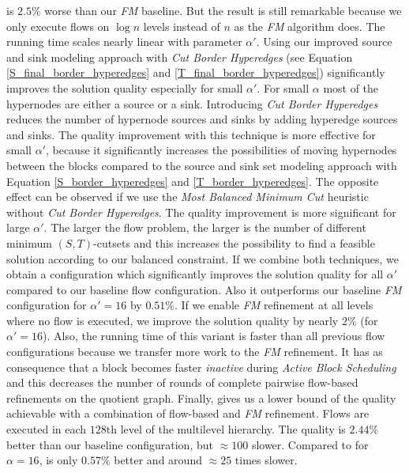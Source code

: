 is $2.5\%$ worse than our \emph{FM} baseline. But the result 
is still remarkable because we only execute flows on $\log{n}$ levels
instead of $n$ as the \emph{FM} algorithm does. The running time
scales nearly linear with parameter $\alpha'$. Using our improved source 
and sink modeling approach with \emph{Cut Border Hyperedges} (see Equation
\ref{S_final_border_hyperedges} and \ref{T_final_border_hyperedges})
significantly improves the solution quality especially for small $\alpha'$.
For small $\alpha$ most of the hypernodes are either a source or a sink. 
Introducing \emph{Cut Border Hyperedges} reduces the number of hypernode
sources and sinks by adding hyperedge sources and sinks. The quality 
improvement with this technique is more effective
for small $\alpha'$, because it significantly increases the possibilities
of moving hypernodes between the blocks compared to the source and sink set
modeling approach with Equation \ref{S_border_hyperedges} and \ref{T_border_hyperedges}.
The opposite effect can be observed if we use the \emph{Most Balanced Minimum Cut} heuristic
without \emph{Cut Border Hyperedges}. The quality improvement is more significant for large
$\alpha'$. The larger the flow problem, the larger is the number of different minimum 
$(S,T)$-cutsets and this increases the possibility to find a feasible solution according to 
our balanced constraint. If we combine both techniques, we obtain a configuration which significantly
improves the solution quality for all $\alpha'$ compared to our baseline flow configuration.
Also it outperforms our baseline \emph{FM} configuration for $\alpha' = 16$ by $0.51\%$.
If we enable \emph{FM} refinement at all levels where no flow is executed, we improve the solution
quality by nearly $2\%$ (for $\alpha' = 16$). Also, the running time of this variant is faster
than all previous flow configurations because we transfer more work to the \emph{FM} refinement.
It has as consequence that a block becomes faster \emph{inactive} during \emph{Active Block 
Scheduling} and this decreases the number of rounds of complete pairwise flow-based refinements
on the quotient graph. Finally,  gives us a lower bound of the quality
achievable with a combination of flow-based and \emph{FM} refinement. Flows are executed 
in each $128$th level of the multilevel hierarchy. The quality is $2.44\%$ better than our
baseline configuration, but $\approx 100$ slower. Compared to \FlowVariant{+}{+}{+}{+} for 
$\alpha = 16$,  is only $0.57\%$ better and around $\approx 25$ times slower.


